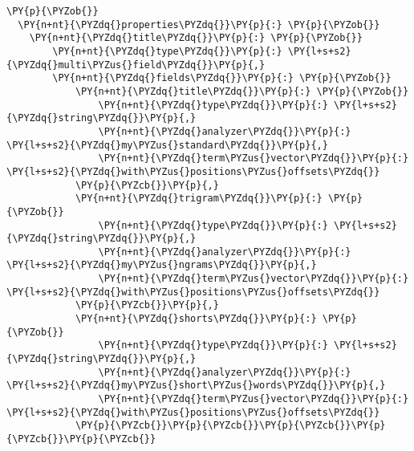 \begin{Verbatim}[commandchars=\\\{\}]
\PY{p}{\PYZob{}}
  \PY{n+nt}{\PYZdq{}properties\PYZdq{}}\PY{p}{:} \PY{p}{\PYZob{}}
    \PY{n+nt}{\PYZdq{}title\PYZdq{}}\PY{p}{:} \PY{p}{\PYZob{}}
        \PY{n+nt}{\PYZdq{}type\PYZdq{}}\PY{p}{:} \PY{l+s+s2}{\PYZdq{}multi\PYZus{}field\PYZdq{}}\PY{p}{,}
        \PY{n+nt}{\PYZdq{}fields\PYZdq{}}\PY{p}{:} \PY{p}{\PYZob{}}
            \PY{n+nt}{\PYZdq{}title\PYZdq{}}\PY{p}{:} \PY{p}{\PYZob{}}
                \PY{n+nt}{\PYZdq{}type\PYZdq{}}\PY{p}{:} \PY{l+s+s2}{\PYZdq{}string\PYZdq{}}\PY{p}{,}
                \PY{n+nt}{\PYZdq{}analyzer\PYZdq{}}\PY{p}{:} \PY{l+s+s2}{\PYZdq{}my\PYZus{}standard\PYZdq{}}\PY{p}{,}
                \PY{n+nt}{\PYZdq{}term\PYZus{}vector\PYZdq{}}\PY{p}{:} \PY{l+s+s2}{\PYZdq{}with\PYZus{}positions\PYZus{}offsets\PYZdq{}}
            \PY{p}{\PYZcb{}}\PY{p}{,}
            \PY{n+nt}{\PYZdq{}trigram\PYZdq{}}\PY{p}{:} \PY{p}{\PYZob{}}
                \PY{n+nt}{\PYZdq{}type\PYZdq{}}\PY{p}{:} \PY{l+s+s2}{\PYZdq{}string\PYZdq{}}\PY{p}{,}
                \PY{n+nt}{\PYZdq{}analyzer\PYZdq{}}\PY{p}{:} \PY{l+s+s2}{\PYZdq{}my\PYZus{}ngrams\PYZdq{}}\PY{p}{,}
                \PY{n+nt}{\PYZdq{}term\PYZus{}vector\PYZdq{}}\PY{p}{:} \PY{l+s+s2}{\PYZdq{}with\PYZus{}positions\PYZus{}offsets\PYZdq{}}
            \PY{p}{\PYZcb{}}\PY{p}{,}
            \PY{n+nt}{\PYZdq{}shorts\PYZdq{}}\PY{p}{:} \PY{p}{\PYZob{}}
                \PY{n+nt}{\PYZdq{}type\PYZdq{}}\PY{p}{:} \PY{l+s+s2}{\PYZdq{}string\PYZdq{}}\PY{p}{,}
                \PY{n+nt}{\PYZdq{}analyzer\PYZdq{}}\PY{p}{:} \PY{l+s+s2}{\PYZdq{}my\PYZus{}short\PYZus{}words\PYZdq{}}\PY{p}{,}
                \PY{n+nt}{\PYZdq{}term\PYZus{}vector\PYZdq{}}\PY{p}{:} \PY{l+s+s2}{\PYZdq{}with\PYZus{}positions\PYZus{}offsets\PYZdq{}}
            \PY{p}{\PYZcb{}}\PY{p}{\PYZcb{}}\PY{p}{\PYZcb{}}\PY{p}{\PYZcb{}}\PY{p}{\PYZcb{}}
\end{Verbatim}
